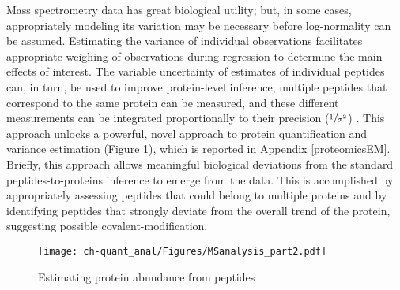 Mass spectrometry data has great biological utility; but, in some cases, appropriately modeling its variation may be necessary before log-normality can be assumed. Estimating the variance of individual observations facilitates appropriate weighing of observations during regression to determine the main effects of interest.  The variable uncertainty of estimates of individual peptides can, in turn, be used to improve protein-level inference; multiple peptides that correspond to the same protein can be measured, and these different measurements can be integrated proportionally to their precision ($\sfrac{1}{\sigma^{2}}$) \cite{Navarro:2014ke}. This approach unlocks a powerful, novel approach to protein quantification and variance estimation (\hyperref[ch-quant_anal:pepToProt]{Figure \ref{ch-quant_anal:pepToProt}}), which is reported in \hyperref[proteomicsEM]{Appendix \ref{proteomicsEM}}. Briefly, this approach allows meaningful biological deviations from the standard peptides-to-proteins inference to emerge from the data. This is accomplished by appropriately assessing peptides that could belong to multiple proteins and by identifying peptides that strongly deviate from the overall trend of the protein, suggesting possible covalent-modification.

\begin{figure}
\begin{center}
\texttt{[image: ch-quant\_anal/Figures/MSanalysis\_part2.pdf]}
\caption[Estimating protein abundance from peptides]{Estimating protein abundance from peptides}
\label{ch-quant_anal:pepToProt}
\end{center}
\end{figure}

